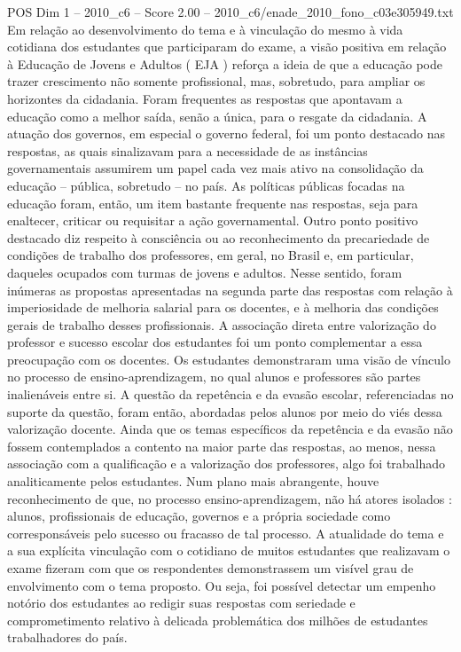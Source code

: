 \begin{textsample}{POS Dim 1 – 2010\_c6 – Score 2.00 – 2010\_c6/enade\_2010\_fono\_c03e305949.txt}
Em relação ao desenvolvimento do tema e à vinculação do mesmo à vida cotidiana dos estudantes que participaram do exame, a visão positiva em relação à Educação de Jovens e Adultos ( EJA ) reforça a ideia de que a educação pode trazer crescimento não somente profissional, mas, sobretudo, para ampliar os horizontes da cidadania.
Foram frequentes as respostas que apontavam a educação como a melhor saída, senão a única, para o resgate da cidadania.
A atuação dos governos, em especial o governo federal, foi um ponto destacado nas respostas, as quais sinalizavam para a necessidade de as instâncias governamentais assumirem um papel cada vez mais ativo na consolidação da educação – pública, sobretudo – no país.
As políticas públicas focadas na educação foram, então, um item bastante frequente nas respostas, seja para enaltecer, criticar ou requisitar a ação governamental.
Outro ponto positivo destacado diz respeito à consciência ou ao reconhecimento da precariedade de condições de trabalho dos professores, em geral, no Brasil e, em particular, daqueles ocupados com turmas de jovens e adultos.
Nesse sentido, foram inúmeras as propostas apresentadas na segunda parte das respostas com relação à imperiosidade de melhoria salarial para os docentes, e à melhoria das condições gerais de trabalho desses profissionais.
A associação direta entre valorização do professor e sucesso escolar dos estudantes foi um ponto complementar a essa preocupação com os docentes.
Os estudantes demonstraram uma visão de vínculo no processo de ensino-aprendizagem, no qual alunos e professores são partes inalienáveis entre si.
A questão da repetência e da evasão escolar, referenciadas no suporte da questão, foram então, abordadas pelos alunos por meio do viés dessa valorização docente.
Ainda que os temas específicos da repetência e da evasão não fossem contemplados a contento na maior parte das respostas, ao menos, nessa associação com a qualificação e a valorização dos professores, algo foi trabalhado analiticamente pelos estudantes.
Num plano mais abrangente, houve reconhecimento de que, no processo ensino-aprendizagem, não há atores isolados : alunos, profissionais de educação, governos e a própria sociedade como corresponsáveis pelo sucesso ou fracasso de tal processo.
A atualidade do tema e a sua explícita vinculação com o cotidiano de muitos estudantes que realizavam o exame fizeram com que os respondentes demonstrassem um visível grau de envolvimento com o tema proposto.
Ou seja, foi possível detectar um empenho notório dos estudantes ao redigir suas respostas com seriedade e comprometimento relativo à delicada problemática dos milhões de estudantes trabalhadores do país.

\end{textsample}
